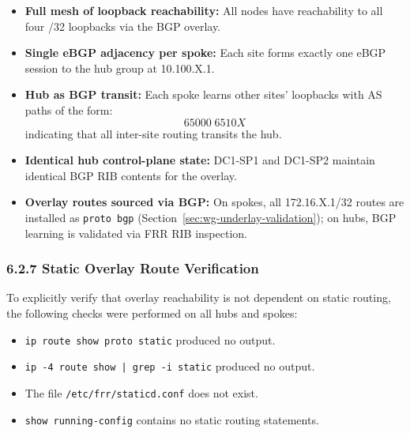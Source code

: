 \documentclass[11pt]{article}
\begin{document}
\begin{itemize}
  \item \textbf{Full mesh of loopback reachability:}
        All nodes have reachability to all four /32 loopbacks via the BGP overlay.
  \item \textbf{Single eBGP adjacency per spoke:}
        Each site forms exactly one eBGP session to the hub group at 10.100.X.1.
  \item \textbf{Hub as BGP transit:}
        Each spoke learns other sites’ loopbacks with AS paths of the form:
        \[
          65000 \; 6510X
        \]
        indicating that all inter-site routing transits the hub.
  \item \textbf{Identical hub control-plane state:}
        DC1-SP1 and DC1-SP2 maintain identical BGP RIB contents for the overlay.
  \item \textbf{Overlay routes sourced via BGP:}
        On spokes, all 172.16.X.1/32 routes are installed as \texttt{proto bgp} (Section~\ref{sec:wg-underlay-validation}); on hubs, BGP learning is validated via FRR RIB inspection.
\end{itemize}

%
%
%
%
\subsubsection{6.2.7 Static Overlay Route Verification}
\label{sec:bgp-overlay-no-static}

To explicitly verify that overlay reachability is not dependent on static routing, the following checks were performed on all hubs and spokes:

\begin{itemize}
  \item \texttt{ip route show proto static} produced no output.
  \item \texttt{ip -4 route show | grep -i static} produced no output.
  \item The file \texttt{/etc/frr/staticd.conf} does not exist.
  \item \texttt{show running-config} contains no static routing statements.
\end{itemize}
\end{document}
